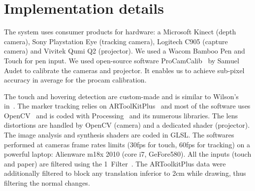 \documentclass{sigchi}
\begin{document}

 

\section{Implementation details} 
 
  The system uses consumer products for hardware: a Microsoft
  Kinect (depth camera), Sony
  Playstation Eye (tracking camera), Logitech C905 (capture camera)
  and Vivitek Qumi Q2 (projector). We used a Wacom Bamboo Pen and Touch
  for pen input. 
  We used open-source software ProCamCalib~\cite{audet2010direct} by
  Samuel Audet to calibrate the cameras and projector. It enables us to
  achieve sub-pixel accuracy in average for the procam calibration. 

  The touch and hovering detection are custom-made and is similar to
  Wilson's in~\cite{wilson2007depth}.
  The marker tracking relies on ARToolKitPlus~\cite{wagner2007artoolkitplus}
  and most of the software uses OpenCV~\cite{opencv_library} and is coded
  with Processing~\cite{processing} and its numerous libraries.
  The lens distortions are handled by OpenCV (camera) and a dedicated
  shader (projector). The image analysis and synthesis shaders are coded in
  GLSL. 
  The softwares performed at cameras frame rates limits (30fps for touch,
  60fps for tracking) on a powerful laptop: Alienware m18x 2010 (core
  i7, GeFore580).
  All the inputs (touch and
  paper) are filtered using the 1\texteuro  ~Filter~\cite{casiez20121}. The
  ARToolkitPlus data were additionally filtered to block any translation
  inferior to 2cm while drawing, thus filtering the normal changes. 
  

\end{document}
